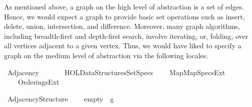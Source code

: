 %
\begin{isabellebody}%
%
%
\isadelimdocument
%
\endisadelimdocument
%
\isatagdocument
%
\isamarkuptrue%
%
\endisatagdocument
{\isafolddocument}%
%
\isadelimdocument
%
\endisadelimdocument
%
\begin{isamarkuptext}%
As mentioned above, a graph on the high level of abstraction is a set of edges. Hence, we would
expect a graph to provide basic set operations such as insert, delete, union, intersection, and
difference. Moreover, many graph algorithms, including breadth-first and depth-first search, involve
iterating, or, folding, over all vertices adjacent to a given vertex. Thus, we would have liked to
specify a graph on the medium level of abstraction via the following locales.%
\end{isamarkuptext}\isamarkuptrue%
%
\isadelimdocument
%
\endisadelimdocument
%
\isatagdocument
%
\isamarkuptrue%
%
\endisatagdocument
{\isafolddocument}%
%
\isadelimdocument
%
\endisadelimdocument
%
\isadelimtheory
%
\endisadelimtheory
%
\isatagtheory
{}\isamarkupfalse%
\ Adjacency\isanewline
\ \ \isanewline
\ \ \ \ {\isachardoublequoteopen}HOL{\isacharminus}{\kern0pt}Data{\isacharunderscore}{\kern0pt}Structures{\isachardot}{\kern0pt}Set{\isacharunderscore}{\kern0pt}Specs{\isachardoublequoteclose}\isanewline
\ \ \ \ {\isachardoublequoteopen}{\isachardot}{\kern0pt}{\isachardot}{\kern0pt}{\isacharslash}{\kern0pt}{\isachardot}{\kern0pt}{\isachardot}{\kern0pt}{\isacharslash}{\kern0pt}Map{\isacharslash}{\kern0pt}Map{\isacharunderscore}{\kern0pt}Specs{\isacharunderscore}{\kern0pt}Ext{\isachardoublequoteclose}\isanewline
\ \ \ \ {\isachardoublequoteopen}{\isachardot}{\kern0pt}{\isachardot}{\kern0pt}{\isacharslash}{\kern0pt}{\isachardot}{\kern0pt}{\isachardot}{\kern0pt}{\isacharslash}{\kern0pt}Orderings{\isacharunderscore}{\kern0pt}Ext{\isachardoublequoteclose}\isanewline
{}%
\endisatagtheory
{\isafoldtheory}%
%
\isadelimtheory
%
\endisadelimtheory
%
\begin{isamarkuptext}%
%
\end{isamarkuptext}\isamarkuptrue%
\isamarkupfalse%
\ Adjacency{\isacharunderscore}{\kern0pt}Structure\ {\isacharequal}{\kern0pt}\isanewline
\ \ \ empty\ {\isacharcolon}{\kern0pt}{\isacharcolon}{\kern0pt}\ {\isachardoublequoteopen}{\isacharprime}{\kern0pt}g{\isachardoublequoteclose}\isanewline

\end{isabellebody}
